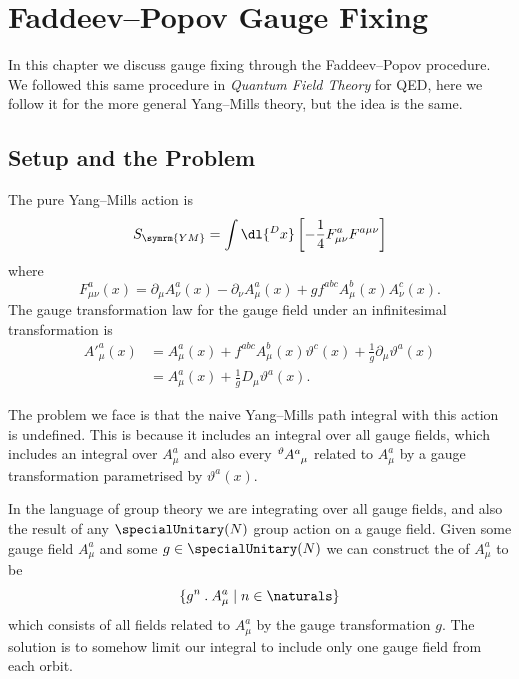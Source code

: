 \documentclass[fleqn]{NotesClass}
\newcommand*{\course}[1]{\textit{#1}}
\newcommand{\covariantDerivative}{D}
\begin{document}
    
    
    
    \chapter{Faddeev--Popov Gauge Fixing}
    In this chapter we discuss gauge fixing through the Faddeev--Popov procedure.
    We followed this same procedure in \course{Quantum Field Theory} for QED, here we follow it for the more general Yang--Mills theory, but the idea is the same.
    
    \section{Setup and the Problem}
    The pure Yang--Mills action is
    \begin{equation}
        S_{\symrm{YM}} = \int \dl{^Dx} \left[ -\frac{1}{4} F^a_{\mu\nu}F^{a\mu\nu} \right]
    \end{equation}
    where
    \begin{equation}
        F^a_{\mu\nu}(x) = \partial_\mu A^a_\nu(x) - \partial_\nu A^a_\mu(x) + g f^{abc}A^b_\mu(x)A^c_\nu(x).
    \end{equation}
    The gauge transformation law for the gauge field under an infinitesimal transformation is
    \begin{align}
        A'^a_\mu(x) &= A^a_\mu(x) + f^{abc}A^b_\mu(x)\vartheta^c(x) + \frac{1}{g}\partial_\mu \vartheta^a(x)\\
        &= A_\mu^a(x) + \frac{1}{g}\covariantDerivative_\mu \vartheta^a(x).
    \end{align}
    
    The problem we face is that the naive Yang--Mills path integral with this action is undefined.
    This is because it includes an integral over all gauge fields, which includes an integral over \(A^a_\mu\) and also every \(\tensor[^\vartheta]{A}{^a_\mu}\) related to \(A^a_\mu\) by a gauge transformation parametrised by \(\vartheta^a(x)\).
    
    In the language of group theory we are integrating over all gauge fields, and also the result of any \(\specialUnitary(N)\) group action on a gauge field.
    Given some gauge field \(A^a_\mu\) and some \(g \in \specialUnitary(N)\) we can construct the  of \(A^a_\mu\) to be 
    \begin{equation}
        \{g^n \mathbin{.} A^a_\mu \mid n \in \naturals\}
    \end{equation}
    which consists of all fields related to \(A^a_\mu\) by the gauge transformation \(g\).
    The solution is to somehow limit our integral to include only one gauge field from each orbit.
    
\end{document}
